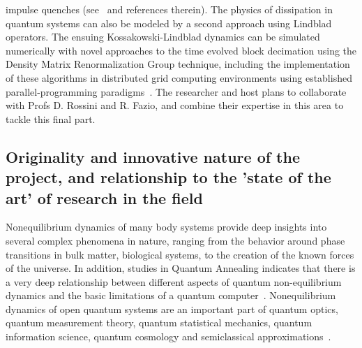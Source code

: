 \documentclass[a4paper,11pt,color]{article}
\begin{document}
impulse quenches (see~\cite{ncnsd2012} and references therein). The physics of dissipation in quantum systems can also be modeled by a second approach using Lindblad operators. The ensuing Kossakowski-Lindblad dynamics  can be simulated numerically with novel approaches to the time evolved block decimation using the Density Matrix Renormalization Group technique, including the implementation of these algorithms in distributed grid computing environments using established parallel-programming paradigms~\cite{white:pdmrg}. The researcher and host plans to collaborate with Profs D. Rossini and R. Fazio, and combine their expertise in this area to tackle this final part.

\subsection{Originality and innovative nature of the project, and relationship to the 'state of the art' of research in the field}
\label{sec:originality}
Nonequilibrium dynamics of many body systems provide deep insights into several complex phenomena in nature, ranging from the behavior around phase transitions in bulk matter, biological systems,  to the creation of the known forces of the universe. In addition, studies in Quantum Annealing indicates that there is a very deep relationship between different aspects of quantum non-equilibrium dynamics and the basic limitations of a quantum computer~\cite{annealing}. Nonequilibrium dynamics of open quantum systems are an important part of quantum optics, quantum measurement theory, quantum statistical mechanics, quantum information science, quantum cosmology and semiclassical approximations~\cite{openq}. 
\end{document}
